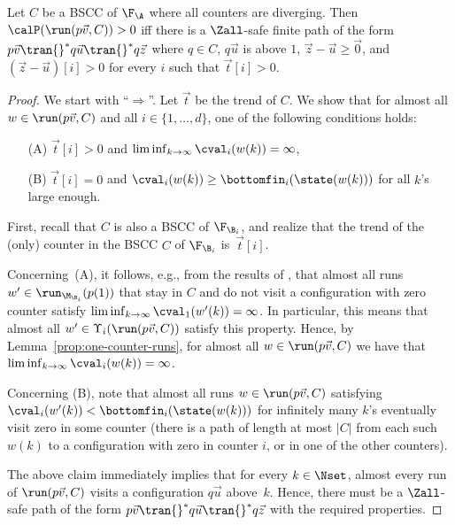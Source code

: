 \begin{lemma}
\label{lem-diverging}
  Let $C$ be a BSCC of $\F_{\A}$ where all counters are diverging.
  Then $\calP(\run(p\vec{v},C)) > 0$ iff there is a $\Zall$-safe finite 
  path of the form $p\vec{v} \tran{}^* q\vec{u} \tran{}^* q\vec{z}$
  where $q \in C$, $q\vec{u}$ is above $1$, $\vec{z} - \vec{u} \geq \vec{0}$,
  and $(\vec{z} - \vec{u})[i] > 0$ for every $i$ such that $\vec{t}[i] > 0$. 


\end{lemma}
\begin{proof}
  We start with ``$\Rightarrow$''. 
  Let $\vec{t}$ be the trend of $C$. We show that for almost
  all $w \in \run(p\vec{v},C)$ and all $i \in \{1,\ldots,d\}$, one of
  the following conditions holds:
  \begin{enumerate}
  \item[(A)] $\vec{t}[i]>0$ and $\liminf_{k\rightarrow \infty} \cval_i(w(k))=\infty$,
  \item[(B)] $\vec{t}[i]=0$ and $\cval_i(w(k))\geq \bottomfin_i(\state(w(k)))$ 
    for all $k$'s large enough.
  \end{enumerate}
  First, recall that $C$ is also a BSCC of $\F_{\B_i}$, and realize that
  the trend of the (only) counter in the BSCC $C$ of $\F_{\B_i}$ is~$\vec{t}[i]$.

  Concerning~(A), it follows, e.g., from the results of
  \cite{BKK:pOC-time-LTL-martingale}, that almost all runs
  $w' \in \run_{\M_{\B_i}}(p(1))$ that stay
  in $C$ and do not visit a configuration with zero counter 
  satisfy $\liminf_{k\rightarrow \infty} \cval_1(w'(k))=\infty$.
  In particular, this means that almost all 
  $w' \in \Upsilon_i(\run(p\vec{v},C))$
  satisfy this property.
  Hence, by Lemma~\ref{prop:one-counter-runs}, for almost all 
  $w \in \run(p\vec{v},C)$ we have that
  \mbox{$\liminf_{k\rightarrow \infty} \cval_i(w(k))=\infty$}.

  Concerning (B), note that almost all runs $w \in \run(p\vec{v},C)$
  satisfying $\cval_i(w'(k)) < \bottomfin_i(\state(w(k)))$
  for infinitely many $k$'s eventually visit zero in some counter 
  (there is a path of length at most $|C|$ from each such
  $w(k)$ to a configuration with zero in counter $i$, or in one of the
  other counters).  

  The above claim immediately implies that for every $k \in \Nset$, 
  almost every run of $\run(p\vec{v},C)$ visits a configuration 
  $q\vec{u}$ above~$k$. Hence, there must be a $\Zall$-safe 
  path of the form $p\vec{v} \tran{}^* q\vec{u} \tran{}^* q\vec{z}$
  with the required properties.



\end{proof}
